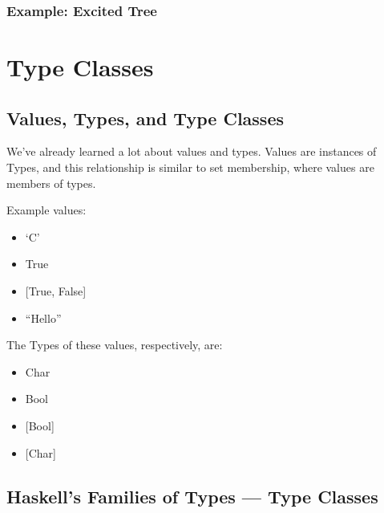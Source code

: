 \hypertarget{example-excited-tree}{%
\subsubsection{Example: Excited Tree}\label{example-excited-tree}}

\begin{Shaded}
\begin{Highlighting}[]
\OtherTok{=}\OperatorTok{++} 
\end{Highlighting}
\end{Shaded}

\hypertarget{type-classes}{%
\section{Type Classes}\label{type-classes}}

\hypertarget{values-types-and-type-classes}{%
\subsection{Values, Types, and Type
Classes}\label{values-types-and-type-classes}}

We've already learned a lot about values and types. Values are instances
of Types, and this relationship is similar to set membership, where
values are members of types.

Example values:

\begin{itemize}
\tightlist
\item
  `C'
\item
  True
\item
  {[}True, False{]}
\item
  ``Hello''
\end{itemize}

The Types of these values, respectively, are:

\begin{itemize}
\tightlist
\item
  Char
\item
  Bool
\item
  {[}Bool{]}
\item
  {[}Char{]}
\end{itemize}

\hypertarget{haskells-families-of-types-type-classes}{%
\subsection{Haskell's Families of Types --- Type
Classes}\label{haskells-families-of-types-type-classes}}

